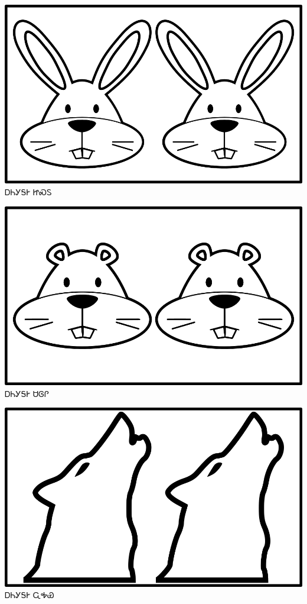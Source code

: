 \documentclass[avery5371]{flashcards}%
\begin{document}
    \begin{flashcard}{
        \includegraphics[width=0.95\columnwidth,height=.51\columnwidth,keepaspectratio]{../artwork/objects-animate/anitali-jisdu}
    }
        \Huge ᎠᏂᎩᎦᎨ ᏥᏍᏚ
    \end{flashcard}

    \begin{flashcard}{
        \includegraphics[width=0.95\columnwidth,height=.51\columnwidth,keepaspectratio]{../artwork/objects-animate/anitali-saloli}
    }
        \Huge ᎠᏂᎩᎦᎨ ᏌᎶᎵ
    \end{flashcard}

    \begin{flashcard}{
        \includegraphics[width=0.95\columnwidth,height=.51\columnwidth,keepaspectratio]{../artwork/objects-animate/anitali-wahya}
    }
        \Huge ᎠᏂᎩᎦᎨ ᏩᎭᏯ
    \end{flashcard}
\end{document}
